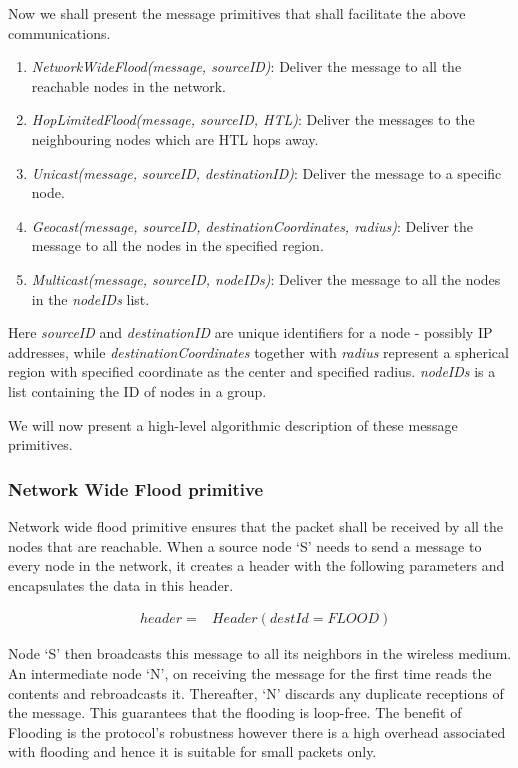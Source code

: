 Now we shall present the message primitives that shall facilitate the above communications. 
\begin{enumerate}
\item \emph{NetworkWideFlood(message, sourceID)}: Deliver  the message to all the reachable nodes in the network.
\item \emph{HopLimitedFlood(message, sourceID, HTL)}: Deliver the messages to the neighbouring nodes which are HTL hops away.
\item \emph{Unicast(message, sourceID, destinationID)}: Deliver the message to a specific node.
\item \emph{Geocast(message, sourceID, destinationCoordinates, radius)}: Deliver the message to all the nodes in the specified region.
\item \emph{Multicast(message, sourceID, nodeIDs)}: Deliver the message to all the nodes in the \emph{nodeIDs} list. 
\end{enumerate}

Here \emph{sourceID} and \emph{destinationID} are unique identifiers for a node - possibly IP addresses, while \emph{destinationCoordinates} together with \emph{radius} represent a spherical region with specified coordinate as the center and specified radius. \emph{nodeIDs} is a list containing the ID of nodes in a group. 

We will now present a high-level algorithmic description of these message primitives.

\subsubsection{Network Wide Flood primitive}

Network wide flood primitive ensures that the packet shall be received by all the nodes that are reachable. When a source node `S' needs to send a message to every node in the network, it creates a header with the following parameters and encapsulates the data in this header.

\begin{eqnarray*}
& header = &Header(destId = FLOOD)
\end{eqnarray*} 

Node `S' then broadcasts this message to all its neighbors in the wireless medium. An intermediate node `N', on receiving the message for the first time reads the contents and rebroadcasts it. Thereafter, `N' discards any duplicate receptions of the message. This guarantees that the flooding is loop-free. The benefit of Flooding is the protocol's robustness however there is a high overhead associated with flooding and hence it is suitable for small packets only.

